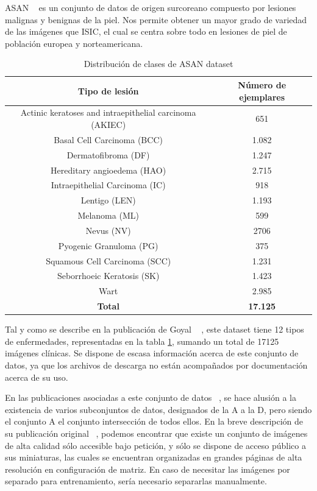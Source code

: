 ASAN ~\cite{Han2017,HAN20181529,HAN20189} es un conjunto de datos de origen surcoreano compuesto por lesiones malignas y benignas de la piel. Nos permite obtener un mayor grado de variedad de las imágenes que ISIC, el cual se centra sobre todo en lesiones de piel de población europea y norteamericana.

\begin{table}[H]
	\centering
	\begin{tabular}{|c|c|}
		\hline
		\textbf{Tipo de lesión} & \textbf{Número de ejemplares} \\ \hline
		{Actinic keratoses and intraepithelial carcinoma (AKIEC)} & 651 \\ \hline
		{Basal Cell Carcinoma (BCC)} & 1.082 \\ \hline
		{Dermatofibroma (DF)} & 1.247 \\ \hline
		{Hereditary angioedema (HAO)} & 2.715 \\ \hline
		{Intraepithelial Carcinoma (IC)} & 918 \\ \hline
		{Lentigo (LEN)} & 1.193 \\ \hline
		{Melanoma (ML)} & 599 \\ \hline
		{Nevus (NV)} & 2706 \\ \hline
		{Pyogenic Granuloma (PG)}  & 375 \\ \hline
		{Squamous Cell Carcinoma (SCC)} & 1.231 \\ \hline
		{Seborrhoeic Keratosis (SK)}  & 1.423 \\ \hline
		{Wart} & 2.985 \\ \hline
		\textbf{Total} & \textbf{17.125} \\ \hline
	\end{tabular}
	\caption{Distribución de clases de ASAN dataset}
	 \label{tab:asandistrib}
\end{table}

Tal y como se describe en la publicación de Goyal ~\cite{goyal2020artificial} , este dataset tiene 12 tipos de enfermedades, representadas en la tabla \ref{tab:asandistrib}, sumando un total de 17125 imágenes clínicas. Se dispone de escasa información acerca de este conjunto de datos, ya que los archivos de descarga no están acompañados por documentación acerca de su uso.


En las publicaciones asociadas a este conjunto de datos ~\cite{Han2017,HAN20181529,HAN20189}, se hace alusión a la existencia de varios subconjuntos de datos, designados de la A a la D, pero siendo el conjunto A el conjunto intersección de todos ellos. En la breve descripción de su publicación original ~\cite{Han2017}, podemos encontrar que existe un conjunto de imágenes de alta calidad sólo accesible bajo petición, y sólo se dispone de acceso público a sus miniaturas, las cuales se encuentran organizadas en grandes páginas de alta resolución en configuración de matriz. En caso de necesitar las imágenes por separado para entrenamiento, sería necesario separarlas manualmente.


